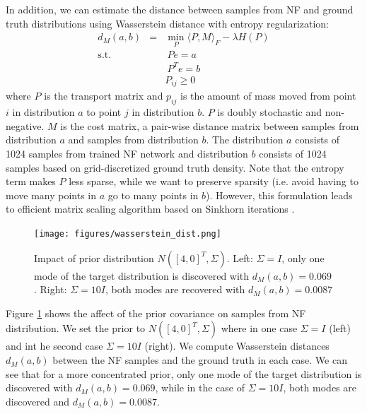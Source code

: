 In addition, we can estimate the distance between samples from NF and ground truth distributions using Wasserstein distance with entropy regularization:
\begin{eqnarray}
    d_{M}(a,b) &=& \min_{P}\langle P,M\rangle_F - \lambda H(P) \\
    \mathrm{s.t.}~&&~Pe = a \nonumber \\
    &&~P^{T}e = b \nonumber \\
    &&P_{ij} \geq 0
\end{eqnarray}
where $P$ is the transport matrix and $p_{ij}$ is the amount of mass moved from point $i$ in distribution $a$ to point $j$ in distribution $b$. $P$ is doubly stochastic and non-negative. $M$ is the cost matrix, a pair-wise distance matrix between samples from distribution $a$ and samples from distribution $b$. The distribution $a$ consists of 1024 samples from trained NF network and distribution $b$ consists of 1024 samples based on grid-discretized ground truth density. Note that the entropy term makes $P$ less sparse, while we want to preserve sparsity (i.e. avoid having to move many points in $a$ go to many points in $b$). However, this formulation leads to efficient matrix scaling algorithm based on Sinkhorn iterations \cite{Cuturi2013}. 

\begin{figure}[thpb]
    \centering
    \texttt{[image: figures/wasserstein\_dist.png]}
    \caption{Impact of prior distribution $N([4,0]^{T}, \Sigma)$. Left: $\Sigma = I$, only one mode of the target distribution is discovered with $d_{M}(a,b) = 0.069$. Right: $\Sigma = 10I$, both modes are recovered with $d_{M}(a,b) = 0.0087$}
    \label{fig:wasserstein_dist}
\end{figure}

Figure \ref{fig:wasserstein_dist} shows the affect of the prior covariance on samples from NF distribution. We set the prior to $N([4,0]^{T}, \Sigma)$ where in one case $\Sigma = I$ (left) and int he second case $\Sigma = 10I$ (right). We compute Wasserstein distances $d_{M}(a,b)$ between the NF samples and the ground truth in each case. We can see that for a more concentrated prior, only one mode of the target distribution is discovered with $d_{M}(a,b) = 0.069$, while in the case of $\Sigma = 10I$, both modes are discovered and $d_{M}(a,b) = 0.0087$. 



